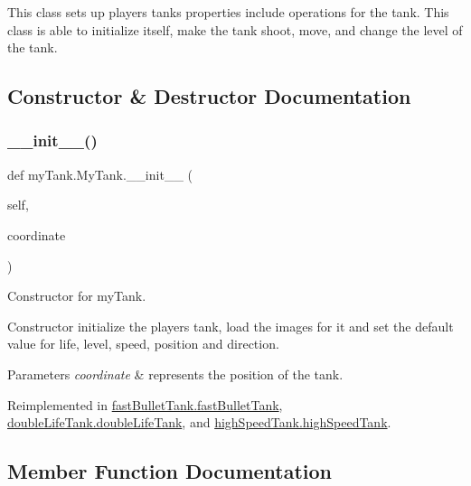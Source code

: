 This class sets up player\textquotesingle{}s tank\textquotesingle{}s properties include operations for the tank. This class is able to initialize itself, make the tank shoot, move, and change the level of the tank. 

\subsection{Constructor \& Destructor Documentation}
\mbox{\label{classmy_tank_1_1_my_tank_a5a2b6c586c454d3801f6701a6befb7e5}} 
\subsubsection{\texorpdfstring{\_\_init\_\_()}{\_\_init\_\_()}}
{\footnotesize\ttfamily def my\+Tank.\+My\+Tank.\+\_\+\+\_\+init\+\_\+\+\_\+ (\begin{DoxyParamCaption}\item[{}]{self,  }\item[{}]{coordinate }\end{DoxyParamCaption})}



Constructor for my\+Tank. 

Constructor initialize the player\textquotesingle{}s tank, load the images for it and set the default value for life, level, speed, position and direction. 
\begin{DoxyParams}{Parameters}
{\em coordinate} & represents the position of the tank. \\
\hline
\end{DoxyParams}


Reimplemented in \mbox{\hyperlink{classfast_bullet_tank_1_1fast_bullet_tank_a7e2b91d0e75f219ffeea3f099c37961e}{fast\+Bullet\+Tank.\+fast\+Bullet\+Tank}}, \mbox{\hyperlink{classdouble_life_tank_1_1double_life_tank_ad27cec1b61748291063b450bf31d4812}{double\+Life\+Tank.\+double\+Life\+Tank}}, and \mbox{\hyperlink{classhigh_speed_tank_1_1high_speed_tank_a43291c342249322293d1c8de585f6923}{high\+Speed\+Tank.\+high\+Speed\+Tank}}.



\subsection{Member Function Documentation}
\mbox{\label{classmy_tank_1_1_my_tank_aebffcf72197496d9209989066f0ff5c1}} 
